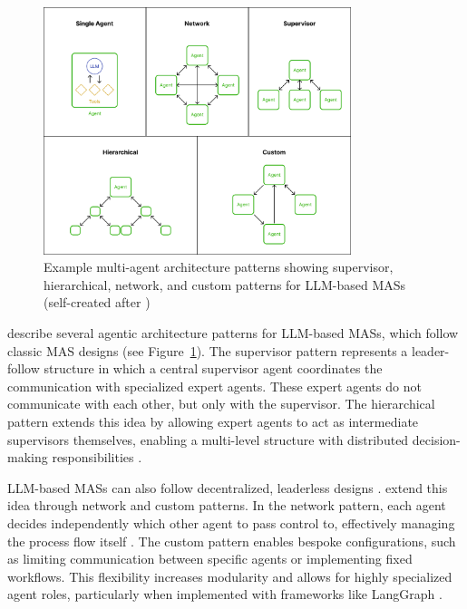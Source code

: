 \documentclass[a4paper,oneside,bibliography=totoc]{scrbook}
\begin{document}
\begin{figure}[t]
  \centering
  \includegraphics[width=0.8\textwidth]{figures/Multi-agent architectures.png}
  \caption[Example multi-agent architecture patterns showing supervisor, hierarchical, network, and custom patterns for LLM-based \acp{MAS}]{Example multi-agent architecture patterns showing supervisor, hierarchical, network, and custom patterns for LLM-based \acp{MAS} (self-created after \cite{LangChain2025b})}
  \label{fig:mas_architecture}
\end{figure}

\citet{LangChain2025b} describe several agentic architecture patterns for \ac{LLM}-based \acp{MAS}, which follow classic \ac{MAS} designs (see Figure~\ref{fig:mas_architecture}). The supervisor pattern represents a leader-follow structure in which a central supervisor agent coordinates the communication with specialized expert agents. These expert agents do not communicate with each other, but only with the supervisor. The hierarchical pattern extends this idea by allowing expert agents to act as intermediate supervisors themselves, enabling a multi-level structure with distributed decision-making responsibilities \cite{LangChain2025b}.

\ac{LLM}-based \acp{MAS} can also follow decentralized, leaderless designs \cite{OpenAI2025,LangChain2025b}. \citet{LangChain2025b} extend this idea through network and custom patterns. In the network pattern, each agent decides independently which other agent to pass control to, effectively managing the process flow itself \cite{LangChain2025b,OpenAI2025}. The custom pattern enables bespoke configurations, such as limiting communication between specific agents or implementing fixed workflows. This flexibility increases modularity and allows for highly specialized agent roles, particularly when implemented with frameworks like LangGraph \cite{LangChain2025b}.
\end{document}
